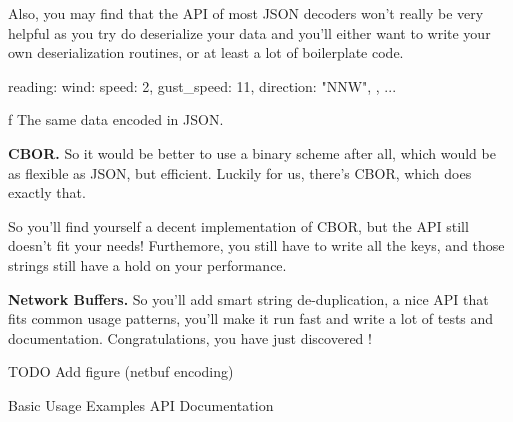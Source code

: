 Also, you may find that the API of most JSON decoders won't really be very
helpful as you try do deserialize your data and you'll either want to write your
own deserialization routines, or at least a lot of boilerplate code.

\bigskip
\begtt
reading: {
    wind: {
        speed: 2,
        gust_speed: 11,
        direction: "NNW",
    }, ...
}
\endtt
\caption/f The same data encoded in JSON.
\bigskip

\noindent
{\bf CBOR.} So it would be better to use a binary scheme after all,
which would be as flexible as JSON, but efficient. Luckily for us, there's
CBOR, which does exactly that.

So you'll find yourself a decent implementation of CBOR, but the API
still doesn't fit your needs! Furthemore, you still have to write all the keys,
and those strings still have a hold on your performance.


\noindent
{\bf Network Buffers.} So you'll add smart string de-duplication, a nice API
that fits common usage patterns, you'll make it run fast and write a lot of
tests and documentation. Congratulations, you have just discovered \nb!

TODO Add figure (netbuf encoding)

\sec Basic Usage
\sec Examples
\sec API Documentation

\bye
